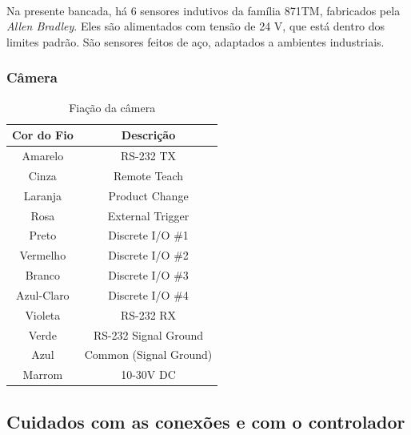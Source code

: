 \documentclass[a4paper,11pt]{scrartcl} %
\numberwithin{equation}{section} %
\numberwithin{figure}{section} %
\numberwithin{table}{section} %
\begin{document}
\paragraph{} Na presente bancada, há 6 sensores indutivos da família 871TM, fabricados pela \textit{Allen Bradley}. Eles são alimentados com tensão de 24 V, que está dentro dos limites padrão. São sensores feitos de aço, adaptados a ambientes industriais.

\subsubsection{Câmera}
\begin{table}[!ht]
  \centering
  \begin{tabular}{|c|c|}
    \hline Cor do Fio & Descrição \\ 
    \hline Amarelo & RS-232 TX \\ 
    \hline Cinza & Remote Teach \\ 
    \hline Laranja & Product Change \\
    \hline Rosa & External Trigger \\ 
    \hline Preto & Discrete I/O \#1 \\ 
    \hline Vermelho & Discrete I/O \#2 \\ 
    \hline Branco & Discrete I/O \#3 \\ 
    \hline Azul-Claro & Discrete I/O \#4 \\ 
    \hline Violeta & RS-232 RX \\ 
    \hline Verde & RS-232 Signal Ground \\ 
    \hline Azul & Common (Signal Ground) \\ 
    \hline Marrom & 10-30V DC \\ \hline  
  \end{tabular}
  \caption{Fiação da câmera\label{FioCamera}} 
\end{table}

\subsection{Cuidados com as conexões e com o controlador}
\end{document}

